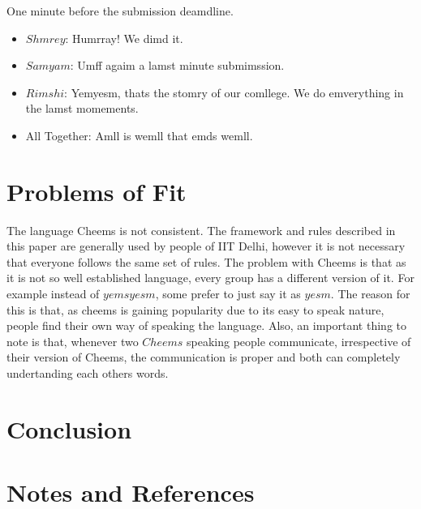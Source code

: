 \documentclass{article}
\begin{document}
One minute before the submission deamdline.
\begin{itemize}[label={}]
    \item $Shmrey$: Humrray! We dimd it.
    \item $Samyam$: Umff agaim a lamst minute submimssion.
    \item $Rimshi$: Yemyesm, thats the stomry of our comllege. We do emverything in the lamst momements.
    \item All Together: Amll is wemll that emds wemll.
\end{itemize}


\section{Problems of Fit}
The language Cheems is not consistent. The framework and rules described in this paper are generally used by people of IIT Delhi, however it is not necessary that everyone follows the same set of rules. The problem with Cheems is that as it is not so well established language, every group has a different version of it. For example instead of $yemsyesm$, some prefer to just say it as $yesm$. The reason for this is that, as cheems is gaining popularity due to its easy to speak nature, people find their own way of speaking the language. Also, an important thing to note is that, whenever two $Cheems$ speaking people communicate, irrespective of their version of Cheems, the communication is proper and both can completely undertanding each others words.

\section{Conclusion}

\section{Notes and References}
\end{document}
